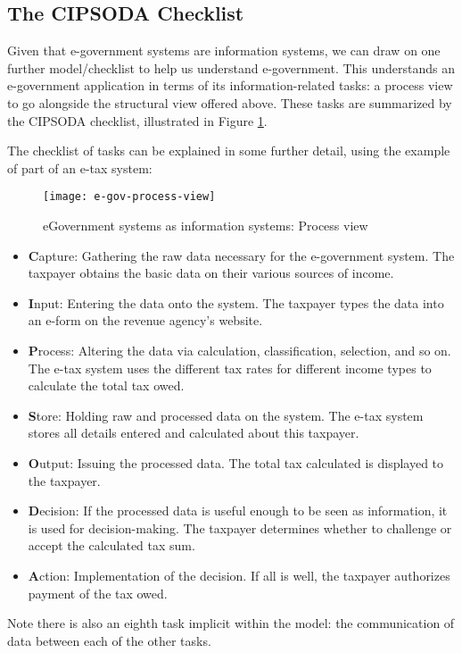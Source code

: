 \subsection*{The CIPSODA Checklist}
Given that e-government systems are
information systems, we can draw on one
further model/checklist to help us understand e-government. This understands an
e-government application in terms of its
information-related tasks: a process view to
go alongside the structural view offered
above. These tasks are summarized by the
CIPSODA checklist, illustrated in Figure \ref{fig:e-gov-process-view}.

The checklist of tasks can be explained in
some further detail, using the example of
part of an e-tax system:

\begin{figure}[ht]
	\centering
	\texttt{[image: e-gov-process-view]}
	\caption{eGovernment systems as information systems: Process view}
	\label{fig:e-gov-process-view}
\end{figure}

\begin{itemize}
	\item \textbf{C}apture: Gathering the raw data necessary for the e-government system. The
	taxpayer obtains the basic data on their
	various sources of income.
	
	\item \textbf{I}nput: Entering the data onto the system.
	The taxpayer types the data into an
	e-form on the revenue agency’s website.
	
	\item \textbf{P}rocess: Altering the data via calculation,
	classification, selection, and so on. The
	e-tax system uses the different tax rates
	for different income types to calculate
	the total tax owed.
	
	\item \textbf{S}tore: Holding raw and processed data
	on the system. The e-tax system stores all
	details entered and calculated about this
	taxpayer.
	
	\item \textbf{O}utput: Issuing the processed data. The
	total tax calculated is displayed to the
	taxpayer.
	
	\item \textbf{D}ecision: If the processed data is useful
	enough to be seen as information, it is
	used for decision-making. The taxpayer
	determines whether to challenge or
	accept the calculated tax sum.
	
	\item \textbf{A}ction: Implementation of the decision.
	If all is well, the taxpayer authorizes payment of the tax owed.

\end{itemize}
Note there is also an eighth task implicit
within the model: the communication of
data between each of the other tasks.


